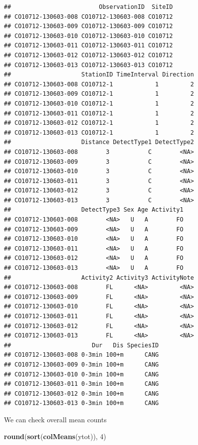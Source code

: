 \documentclass[12pt,]{scrbook}
\newenvironment{Shaded}{\begin{snugshade}}{\end{snugshade}}
\newcommand{\DecValTok}[1]{\textcolor[rgb]{0.00,0.00,0.81}{#1}}
\newcommand{\KeywordTok}[1]{\textcolor[rgb]{0.13,0.29,0.53}{\textbf{#1}}}
\newcommand{\NormalTok}[1]{#1}
\begin{document}
\begin{verbatim}
##                         ObservationID  SiteID
## CO10712-130603-008 CO10712-130603-008 CO10712
## CO10712-130603-009 CO10712-130603-009 CO10712
## CO10712-130603-010 CO10712-130603-010 CO10712
## CO10712-130603-011 CO10712-130603-011 CO10712
## CO10712-130603-012 CO10712-130603-012 CO10712
## CO10712-130603-013 CO10712-130603-013 CO10712
##                    StationID TimeInterval Direction
## CO10712-130603-008 CO10712-1            1         2
## CO10712-130603-009 CO10712-1            1         2
## CO10712-130603-010 CO10712-1            1         2
## CO10712-130603-011 CO10712-1            1         2
## CO10712-130603-012 CO10712-1            1         2
## CO10712-130603-013 CO10712-1            1         2
##                    Distance DetectType1 DetectType2
## CO10712-130603-008        3           C        <NA>
## CO10712-130603-009        3           C        <NA>
## CO10712-130603-010        3           C        <NA>
## CO10712-130603-011        3           C        <NA>
## CO10712-130603-012        3           C        <NA>
## CO10712-130603-013        3           C        <NA>
##                    DetectType3 Sex Age Activity1
## CO10712-130603-008        <NA>   U   A        FO
## CO10712-130603-009        <NA>   U   A        FO
## CO10712-130603-010        <NA>   U   A        FO
## CO10712-130603-011        <NA>   U   A        FO
## CO10712-130603-012        <NA>   U   A        FO
## CO10712-130603-013        <NA>   U   A        FO
##                    Activity2 Activity3 ActivityNote
## CO10712-130603-008        FL      <NA>         <NA>
## CO10712-130603-009        FL      <NA>         <NA>
## CO10712-130603-010        FL      <NA>         <NA>
## CO10712-130603-011        FL      <NA>         <NA>
## CO10712-130603-012        FL      <NA>         <NA>
## CO10712-130603-013        FL      <NA>         <NA>
##                       Dur   Dis SpeciesID
## CO10712-130603-008 0-3min 100+m      CANG
## CO10712-130603-009 0-3min 100+m      CANG
## CO10712-130603-010 0-3min 100+m      CANG
## CO10712-130603-011 0-3min 100+m      CANG
## CO10712-130603-012 0-3min 100+m      CANG
## CO10712-130603-013 0-3min 100+m      CANG
\end{verbatim}

We can check overall mean counts

\begin{Shaded}
\begin{Highlighting}[]
\KeywordTok{round}\NormalTok{(}\KeywordTok{sort}\NormalTok{(}\KeywordTok{colMeans}\NormalTok{(ytot)), }\DecValTok{4}\NormalTok{)}
\end{Highlighting}
\end{Shaded}
\end{document}
